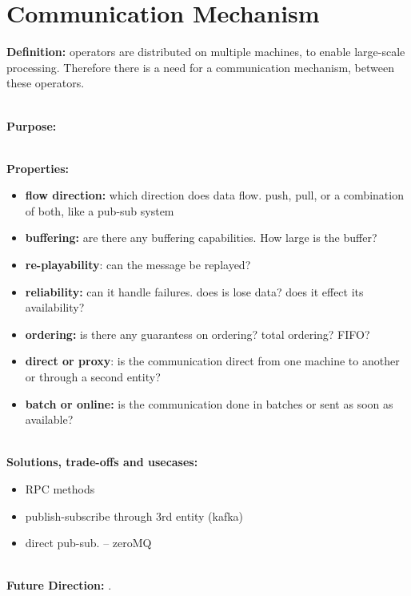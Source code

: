 \section{Communication Mechanism}
\label{sec:communication}


\noindent\textbf{Definition:} 
operators are distributed on multiple machines, to enable large-scale processing. Therefore there is a need for a communication mechanism, between these operators. 

\noindent \textbf{\\Purpose:} 


\noindent \textbf{\\Properties:}

\begin{itemize}
	\item \textbf{flow direction:} which direction does data flow. push, pull, or a combination of both, like a pub-sub system
	\item \textbf{buffering: } are there any buffering capabilities. How large is the buffer?
	\item \textbf{re-playability}: can the message be replayed?
	\item \textbf{reliability: }can it handle failures. does is lose data? does it effect its availability?
	\item \textbf{ordering:} is there any guarantess on ordering? total ordering? FIFO?
	\item \textbf{ direct or proxy}: is the communication direct from one machine to another or through a second entity?
\item \textbf{ batch or online: } is the communication done in batches or sent as soon as available?
\end{itemize}

\noindent \textbf{\\Solutions, trade-offs and usecases:}

\begin{itemize}
	\item RPC methods
	\item publish-subscribe through 3rd entity (kafka)
	\item direct pub-sub. -- zeroMQ
	
\end{itemize}



\noindent \textbf{\\Future Direction:}  
.




